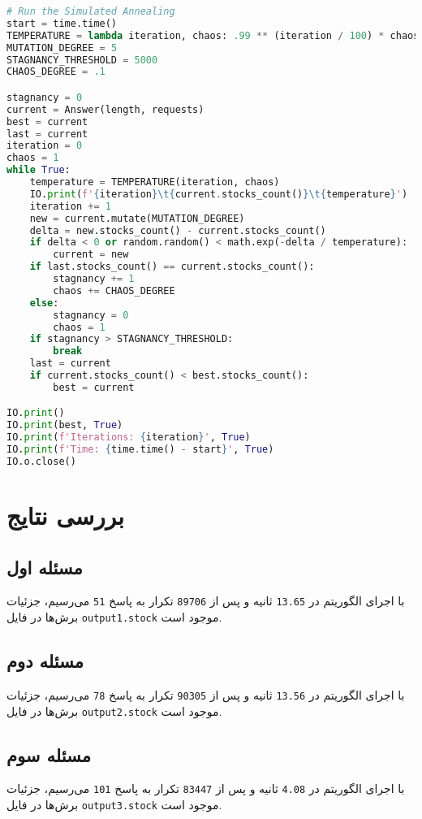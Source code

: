 \documentclass[a4paper, 12pt]{article}
\begin{document}
\LTR
\begin{lstlisting}[language=Python]
# Run the Simulated Annealing
start = time.time()
TEMPERATURE = lambda iteration, chaos: .99 ** (iteration / 100) * chaos
MUTATION_DEGREE = 5
STAGNANCY_THRESHOLD = 5000
CHAOS_DEGREE = .1

stagnancy = 0
current = Answer(length, requests)
best = current
last = current
iteration = 0
chaos = 1
while True:
    temperature = TEMPERATURE(iteration, chaos)
    IO.print(f'{iteration}\t{current.stocks_count()}\t{temperature}')
    iteration += 1
    new = current.mutate(MUTATION_DEGREE)
    delta = new.stocks_count() - current.stocks_count()
    if delta < 0 or random.random() < math.exp(-delta / temperature):
        current = new
    if last.stocks_count() == current.stocks_count():
        stagnancy += 1
        chaos += CHAOS_DEGREE
    else:
        stagnancy = 0
        chaos = 1
    if stagnancy > STAGNANCY_THRESHOLD:
        break
    last = current
    if current.stocks_count() < best.stocks_count():
        best = current

IO.print()
IO.print(best, True)
IO.print(f'Iterations: {iteration}', True)
IO.print(f'Time: {time.time() - start}', True)
IO.o.close()    
\end{lstlisting}
\RTL

\newpage
\section{بررسی نتایج}

\subsection{مسئله اول}
با اجرای الگوریتم در
\texttt{13.65}
ثانیه و پس از
\texttt{89706}
تکرار به پاسخ
\texttt{51}
می‌رسیم، جزئیات برش‌ها در فایل
\texttt{output1.stock}
موجود است.

\subsection{مسئله دوم}
با اجرای الگوریتم در
\texttt{13.56}
ثانیه و پس از
\texttt{90305}
تکرار به پاسخ
\texttt{78}
می‌رسیم، جزئیات برش‌ها در فایل
\texttt{output2.stock}
موجود است.

\subsection{مسئله سوم}
با اجرای الگوریتم در
\texttt{4.08}
ثانیه و پس از
\texttt{83447}
تکرار به پاسخ
\texttt{101}
می‌رسیم، جزئیات برش‌ها در فایل
\texttt{output3.stock}
موجود است.
\end{document}
